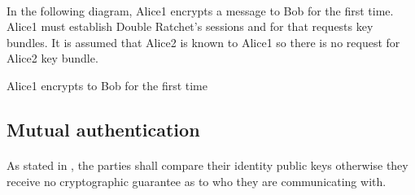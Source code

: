 \documentclass[a4paper,11pt]{article}
\begin{document}
    \paragraph{}In the following diagram, Alice1 encrypts a message to Bob for the first time. Alice1 must establish Double Ratchet's sessions and for that requests key bundles. It is assumed that Alice2 is known to Alice1 so there is no request for Alice2 key bundle.\\\newline
    \begin{msc}{Alice1 encrypts to Bob for the first time}
    \setlength{\instdist}{2.9cm}
    \setlength{\envinstdist}{0.85cm}
    \nextlevel
    \nextlevel[2]
    \nextlevel
    \nextlevel
    \nextlevel
    \nextlevel
    \nextlevel
    \nextlevel[2]
    \nextlevel
    \nextlevel[3]
    \nextlevel[2]
    \nextlevel
    \nextlevel
    \end{msc}
    
  \subsection{Mutual authentication}
    \label{subsec:mutualauthentication}
    \paragraph{}As stated in \cite[section 4.1]{x3dh}, the parties shall compare their identity public keys otherwise they receive no cryptographic guarantee as to who they are communicating with.
\end{document}
